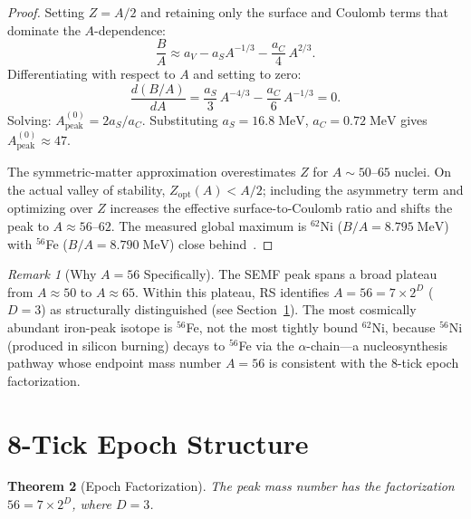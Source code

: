 \documentclass[12pt,a4paper]{article}
\newtheorem{theorem}{Theorem}[section]
\theoremstyle{definition}
\theoremstyle{remark}
\newtheorem{remark}[theorem]{Remark}
\begin{document}
\begin{proof}
Setting $Z = A/2$ and retaining only the surface and Coulomb
terms that dominate the $A$-dependence:
\begin{equation}
  \frac{B}{A} \approx a_V - a_S A^{-1/3}
  - \frac{a_C}{4}\,A^{2/3}.
\end{equation}
Differentiating with respect to $A$ and setting to zero:
\begin{equation}
  \frac{d(B/A)}{dA} = \frac{a_S}{3}\,A^{-4/3}
  - \frac{a_C}{6}\,A^{-1/3} = 0.
\end{equation}
Solving: $A_{\mathrm{peak}}^{(0)} = 2a_S/a_C$.
Substituting $a_S = 16.8\;\mathrm{MeV}$,
$a_C = 0.72\;\mathrm{MeV}$ gives
$A_{\mathrm{peak}}^{(0)} \approx 47$.

The symmetric-matter approximation overestimates $Z$ for
$A \sim 50$--$65$ nuclei.  On the actual valley of stability,
$Z_{\mathrm{opt}}(A) < A/2$; including the asymmetry term and
optimizing over $Z$ increases the effective surface-to-Coulomb
ratio and shifts the peak to $A \approx 56$--$62$.  The
measured global maximum is $^{62}$Ni ($B/A = 8.795\;\mathrm{MeV}$)
with $^{56}$Fe ($B/A = 8.790\;\mathrm{MeV}$) close
behind~\cite{AME2020}.
\end{proof}

\begin{remark}[Why $A = 56$ Specifically]
The SEMF peak spans a broad plateau from $A \approx 50$ to
$A \approx 65$.  Within this plateau, RS identifies
$A = 56 = 7 \times 2^D$ ($D = 3$) as structurally distinguished
(see Section~\ref{sec:8tick}).  The most cosmically abundant
iron-peak isotope is $^{56}$Fe, not the most tightly bound
$^{62}$Ni, because $^{56}$Ni (produced in silicon burning)
decays to $^{56}$Fe via the $\alpha$-chain---a nucleosynthesis
pathway whose endpoint mass number $A = 56$ is consistent with
the 8-tick epoch factorization.
\end{remark}

\section{8-Tick Epoch Structure}
\label{sec:8tick}

\begin{theorem}[Epoch Factorization]
\label{thm:56}
The peak mass number has the factorization
$56 = 7 \times 2^D$, where $D = 3$.
\end{theorem}
\end{document}

